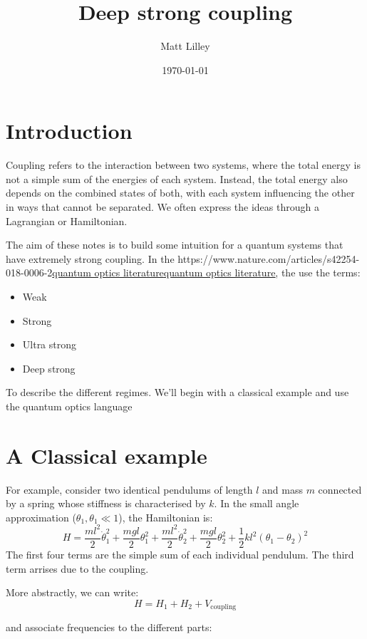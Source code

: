 \documentclass[
]{article}
\title{Deep strong coupling}
\author{Matt Lilley}
\date{\today}  %
\let\oldhref\href
\renewcommand{\href}[2]{\ifx#1\urlprefix\oldhref{#1}{#2}\else\uline{\oldhref{#1}{#2}}\fi}
\renewcommand{\[}{\begin{equation}}
\renewcommand{\]}{\end{equation}}
\providecommand{\tightlist}{%
  \setlength{\itemsep}{0pt}\setlength{\parskip}{0pt}}
\begin{document}
\maketitle

\section{Introduction}\label{introduction}

Coupling refers to the interaction between two systems, where the total
energy is not a simple sum of the energies of each system. Instead, the
total energy also depends on the combined states of both, with each
system influencing the other in ways that cannot be separated. We often
express the ideas through a Lagrangian or Hamiltonian.

The aim of these notes is to build some intuition for a quantum systems
that have extremely strong coupling. In the
\href{https://www.nature.com/articles/s42254-018-0006-2}{quantum optics
literature}, the use the terms:

\begin{itemize}
\tightlist
\item
  Weak
\item
  Strong
\item
  Ultra strong
\item
  Deep strong
\end{itemize}

To describe the different regimes. We'll begin with a classical example
and use the quantum optics language

\section{A Classical example}\label{a-classical-example}

For example, consider two identical pendulums of length \(l\) and mass
\(m\) connected by a spring whose stiffness is characterised by \(k\).
In the small angle approximation (\(\theta_1, \theta_1 \ll 1\)), the
Hamiltonian is: \[
H = \frac{m l^2}{2} \dot{\theta}_1^2 + \frac{m g l}{2} \theta_1^2 + \frac{m l^2}{2} \dot{\theta}_2^2 + \frac{m g l}{2} \theta_2^2 + \frac{1}{2} k l^2(\theta_1 - \theta_2)^2
\] The first four terms are the simple sum of each individual pendulum.
The third term arrises due to the coupling.

More abstractly, we can write: \[
H = H_1 + H_2+ V_{\text{coupling}}
\]

and associate frequencies to the different parts:
\end{document}
